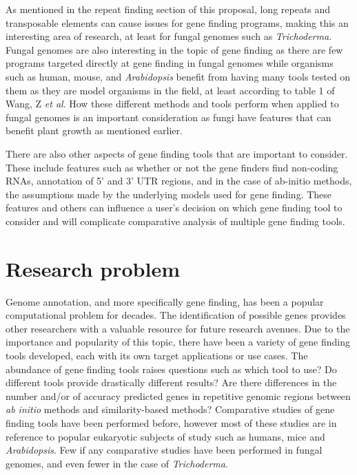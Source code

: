 \documentclass[12pt]{article}
\begin{document}
As mentioned in the repeat finding section of this proposal, long
repeats and transposable elements can cause issues for gene finding
programs, making this an interesting area of research, at least for
fungal genomes such as \textit{Trichoderma}. Fungal genomes are also
interesting in the topic of gene finding as there are few programs
targeted directly at gene finding in fungal genomes while organisms
such as human, mouse, and \textit{Arabidopsis} benefit from having
many tools tested on them as they are model organisms in the field, at
least according to table 1 of Wang, Z \textit{et
  al}\cite{GeneFinding}. How these different methods and tools perform
when applied to fungal genomes is an important consideration as fungi
have features that can benefit plant growth as mentioned earlier.

There are also other aspects of gene finding tools that are important
to consider. These include features such as whether or not the gene
finders find non-coding RNAs, annotation of 5' and 3' UTR regions, and
in the case of ab-initio methods, the assumptions made by the
underlying models used for gene finding. These features and others can
influence a user's decision on which gene finding tool to consider and
will complicate comparative analysis of multiple gene finding tools.


\section{Research problem}
Genome annotation, and more specifically gene finding, has been a
popular computational problem for decades. The identification of
possible genes provides other researchers with a valuable resource for
future research avenues. Due to the importance and popularity of this
topic, there have been a variety of gene finding tools developed, each
with its own target applications or use cases. The abundance of gene
finding tools raises questions such as which tool to use? Do different
tools provide drastically different results? Are there differences in
the number and/or of accuracy predicted genes in repetitive genomic
regions between \textit{ab initio} methods and similarity-based
methods?  Comparative studies of gene finding tools have been
performed before, however most of these studies are in reference to
popular eukaryotic subjects of study such as humans, mice and
\textit{Arabidopsis}. Few if any comparative studies have been
performed in fungal genomes, and even fewer in the case of
\textit{Trichoderma}.
\end{document}

